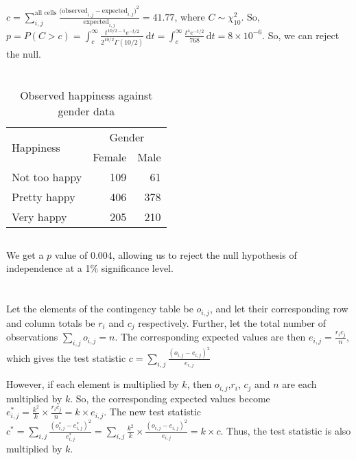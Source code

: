 \documentclass[twocolumn]{article}
\newcommand{\setsection}[1]{\setcounter{section}{#1}\addtocounter{section}{-1}\section{}}
\newcommand{\intg}[4]{\int_{#1}^{#2} \! #3 \, \mathrm{d}#4}
\begin{document}
$c=\sum_{i,j}^\text{all cells}\frac{\text{(observed}_{i,j}-\text{expected}_{i,j})^2}{\text{expected}_{i,j}}=41.77$, where $C\sim\chi^2_{10}$. So, $p=P(C>c)=\intg{c}{\infty}{
	\frac{
	t^{10/2-1}e^{-t/2}
	}{
	2^{10/2}\Gamma(10/2)
	}
}{t}
=\intg{c}{\infty}{
	\frac{
	t^{4}e^{-t/2}
	}{
	768
	}
}{t}=8\times10^{-6}$.
So, we can reject the null.

\setsection{17}
\subsection{}
\begin{table}[h]
\centering
\begin{tabular}{@{}lrr@{}}
\toprule
\multirow{2}{*}{Happiness} & \multicolumn{2}{c}{Gender} \\ \cmidrule(l){2-3} 
                           & Female        & Male       \\ \midrule
Not too happy              & 109           & 61         \\
Pretty happy               & 406           & 378        \\
Very happy                 & 205           & 210        \\ \bottomrule
\end{tabular}
\caption{Observed happiness against gender data}
\end{table}

\subsection{}

We get a $p$ value of 0.004, allowing us to reject the null hypothesis of independence at a 1\% significance level.

\setsection{19}
\subsection{} Let the elements of the contingency table be $o_{i,j}$, and let their corresponding row and column totals be $r_i$ and $c_j$ respectively. Further, let the total number of observations $\sum_{i,j} o_{i,j} = n$. The corresponding expected values are then $e_{i,j}=\frac{r_i c_j}{n}$, which gives the test statistic $c=\sum_{i,j}
	\frac{
		(o_{i,j}-e_{i,j})^2
	}{
		e_{i,j}
	}
$

However, if each element is multiplied by $k$, then $o_{i,j}$,$r_i$, $c_j$ and $n$ are each multiplied by $k$. So, the corresponding expected values become $e^*_{i,j}=\frac{k^2}{k}\times\frac{r_i c_j}{n}=k\times e_{i,j}$. The new test statistic $c^*=\sum_{i,j}
	\frac{
		(o^*_{i,j}-e^*_{i,j})^2
	}{
		e^*_{i,j}
	}
=\sum_{i,j}
\frac{k^2}{k}\times\frac{
		(o_{i,j}-e_{i,j})^2
	}{
		e_{i,j}
	}
=k\times c
$. Thus, the test statistic is also multiplied by $k$.
\end{document}

